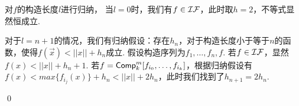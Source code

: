 \begin{pf} \rm 
    对$f$的构造长度$l$进行归纳，
    当$l=0$时，我们有$f\in\mathcal{IF}$，此时取$h=2$，不等式显然恒成立.
    
    对于$l=n+1$的情况，我们有归纳假设：存在$h_n$，对于构造长度小于等于$n$的函数，使得$f(\vec{x})<||x||+h_n$成立. 假设构造序列为$f_1,\dots,f_n,f$. 若$f\in\mathcal{IF}$，显然$f(x)<||x||+h_n+1$. 若$f=\textsf{Comp}_k^m[f_{i_0},\dots,f_{i_k}]$，根据归纳假设有$f(x)<max\{f_{i_j}(x)\}+h_n<||x||+2h_n$，此时我们找到了$h_{n+1}=2h_n$.

    \qed
\end{pf}
